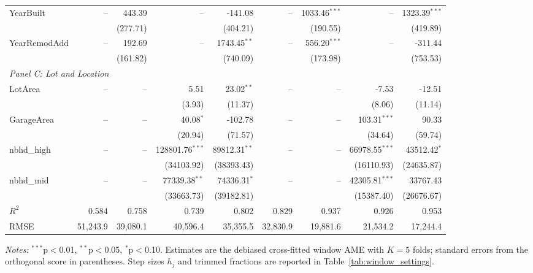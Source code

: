 \begin{table}[htbp]
\begin{threeparttable}
\begin{tabular}{lrrrrrrrr}
\quad YearBuilt & -- & 443.39 & -- & -141.08 & -- & 1033.46$^{***}$ & -- & 1323.39$^{***}$ \\
 &  & (277.71) &  & (404.21) &  & (190.55) &  & (419.89) \\
\quad YearRemodAdd & -- & 192.69 & -- & 1743.45$^{**}$ & -- & 556.20$^{***}$ & -- & -311.44 \\
 &  & (161.82) &  & (740.09) &  & (173.98) &  & (753.53) \\
\midrule
\multicolumn{9}{l}{\textit{Panel C: Lot and Location}} \\
\quad LotArea & -- & -- & 5.51 & 23.02$^{**}$ & -- & -- & -7.53 & -12.51 \\
 &  &  & (3.93) & (11.37) &  &  & (8.06) & (11.14) \\
\quad GarageArea & -- & -- & 40.08$^{*}$ & -102.78 & -- & -- & 103.31$^{***}$ & 90.33 \\
 &  &  & (20.94) & (71.57) &  &  & (34.64) & (59.74) \\
\quad nbhd\_high & -- & -- & 128801.76$^{***}$ & 89812.31$^{**}$ & -- & -- & 66978.55$^{***}$ & 43512.42$^{*}$ \\
 &  &  & (34103.92) & (38393.43) &  &  & (16110.93) & (24635.87) \\
\quad nbhd\_mid & -- & -- & 77339.38$^{**}$ & 74336.31$^{*}$ & -- & -- & 42305.81$^{***}$ & 33767.43 \\
 &  &  & (33663.73) & (39182.81) &  &  & (15387.40) & (26676.67) \\
\midrule
$R^2$ & 0.584 & 0.758 & 0.739 & 0.802 & 0.829 & 0.937 & 0.926 & 0.953 \\
RMSE & 51,243.9 & 39,080.1 & 40,596.4 & 35,355.5 & 32,830.9 & 19,881.6 & 21,534.2 & 17,244.4 \\
\bottomrule
\end{tabular}
\begin{tablenotes}
\footnotesize
\item \textit{Notes:} $^{***}$p$<$0.01, $^{**}$p$<$0.05, $^{*}$p$<$0.10. Estimates are the debiased cross-fitted window AME with $K=5$ folds; standard errors from the orthogonal score in parentheses. Step sizes $h_j$ and trimmed fractions are reported in Table~\ref{tab:window_settings}.
\end{tablenotes}
\end{threeparttable}
\end{table}